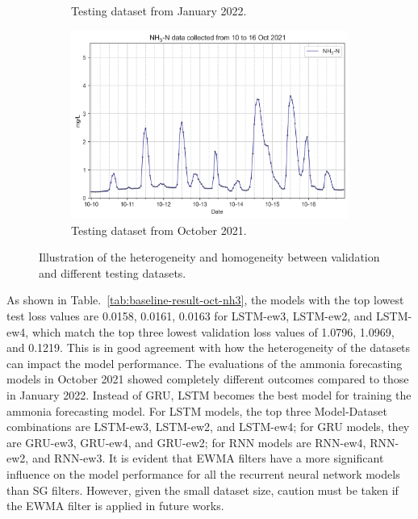 \begin{figure}[!ht]
\begin{subfigure}[t]{0.45\textwidth}
    \caption{Testing dataset from January 2022.} \label{fig:jan-test-data}
  \end{subfigure}
  \begin{subfigure}[t]{0.45\textwidth}
    \includegraphics[width=\linewidth]{imgs/results/heterogeneity-test-oct.png}
    \caption{Testing dataset from October 2021.} \label{fig:oct-test-data}
  \end{subfigure} 
\caption{Illustration of the heterogeneity and homogeneity between validation and different testing datasets.} \label{fig:heterogeneity}
\end{figure}


As shown in Table.~\ref{tab:baseline-result-oct-nh3}, the models with the top lowest test loss values are 0.0158, 0.0161, 0.0163 for LSTM-ew3, LSTM-ew2, and LSTM-ew4, which match the top three lowest validation loss values of 1.0796, 1.0969, and 0.1219. This is in good agreement with how the heterogeneity of the datasets can impact the model performance. The evaluations of the ammonia forecasting models in October 2021 showed completely different outcomes compared to those in January 2022. Instead of GRU, LSTM becomes the best model for training the ammonia forecasting model. For LSTM models, the top three Model-Dataset combinations are LSTM-ew3, LSTM-ew2, and LSTM-ew4; for GRU models, they are GRU-ew3, GRU-ew4, and GRU-ew2; for RNN models are RNN-ew4, RNN-ew2, and RNN-ew3. It is evident that EWMA filters have a more significant influence on the model performance for all the recurrent neural network models than SG filters. However, given the small dataset size, caution must be taken if the EWMA filter is applied in future works.

